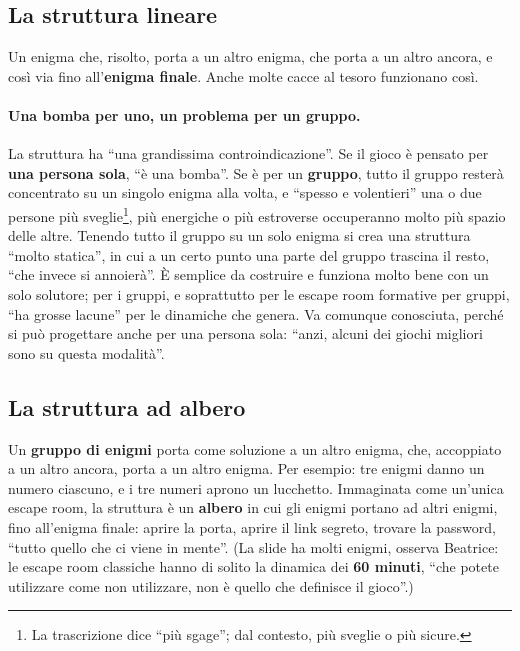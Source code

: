 \subsection{La struttura lineare}

Un enigma che, risolto, porta a un altro enigma, che porta a un altro ancora, e così
via fino all'\textbf{enigma finale}. Anche molte cacce al tesoro funzionano così.

\paragraph{Una bomba per uno, un problema per un gruppo.} La struttura ha ``una
grandissima controindicazione''. Se il gioco è pensato per \textbf{una persona sola},
``è una bomba''. Se è per un \textbf{gruppo}, tutto il gruppo resterà concentrato su
un singolo enigma alla volta, e ``spesso e volentieri'' una o due persone più
sveglie\footnote{La trascrizione dice ``più sgage''; dal contesto, più sveglie o più
sicure.}, più energiche o più estroverse occuperanno molto più spazio delle altre.
Tenendo tutto il gruppo su un solo enigma si crea una struttura ``molto statica'', in
cui a un certo punto una parte del gruppo trascina il resto, ``che invece si
annoierà''. È semplice da costruire e funziona molto bene con un solo solutore; per i
gruppi, e soprattutto per le escape room formative per gruppi, ``ha grosse lacune'' per
le dinamiche che genera. Va comunque conosciuta, perché si può progettare anche per
una persona sola: ``anzi, alcuni dei giochi migliori sono su questa modalità''.

\subsection{La struttura ad albero}

Un \textbf{gruppo di enigmi} porta come soluzione a un altro enigma, che, accoppiato a
un altro ancora, porta a un altro enigma. Per esempio: tre enigmi danno un numero
ciascuno, e i tre numeri aprono un lucchetto. Immaginata come un'unica escape room,
la struttura è un \textbf{albero} in cui gli enigmi portano ad altri enigmi, fino
all'enigma finale: aprire la porta, aprire il link segreto, trovare la password,
``tutto quello che ci viene in mente''. (La slide ha molti enigmi, osserva Beatrice:
le escape room classiche hanno di solito la dinamica dei \textbf{60 minuti}, ``che
potete utilizzare come non utilizzare, non è quello che definisce il gioco''.)

